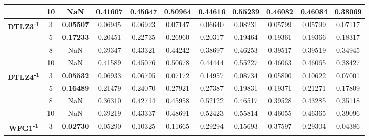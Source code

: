 \documentclass[conference]{IEEEtran}
\begin{document}
\begin{table*}[!htb]
\begin{tabular}{|c|c|c|c|c|c|c|c|c|c|c|}
		& 10         & NaN              & 0.41607           & 0.45647               & 0.50964          & 0.44616             & 0.55239             & 0.46082            & 0.46084              & 0.38069          \\ \hline
		\multirow{4}{*}{\textbf{DTLZ3\textsuperscript{-1}}} & 3          & \textbf{0.05507} & 0.06945           & 0.06923               & 0.07147          & 0.06640             & 0.08231             & 0.05799            & 0.05799              & 0.07117          \\ \cline{2-11} 
		& 5          & \textbf{0.17233} & 0.20451           & 0.22735               & 0.26960          & 0.20317             & 0.19464             & 0.19361            & 0.19366              & 0.18317          \\ \cline{2-11} 
		& 8          & NaN              & 0.39347           & 0.43321               & 0.44242          & 0.38697             & 0.46253             & 0.39517            & 0.39519              & 0.34945          \\ \cline{2-11} 
		& 10         & NaN              & 0.41589           & 0.45076               & 0.50678          & 0.44444             & 0.55227             & 0.46063            & 0.46065              & 0.38427          \\ \hline
		\multirow{4}{*}{\textbf{DTLZ4\textsuperscript{-1}}} & 3          & \textbf{0.05532} & 0.06933           & 0.06795               & 0.07172          & 0.14957             & 0.08734             & 0.05800            & 0.10622              & 0.07001          \\ \cline{2-11} 
		& 5          & \textbf{0.16489} & 0.21479           & 0.24070               & 0.27921          & 0.27387             & 0.19831             & 0.19371            & 0.21271              & 0.17809          \\ \cline{2-11} 
		& 8          & NaN              & 0.36310           & 0.42714               & 0.45958          & 0.52122             & 0.46517             & 0.39528            & 0.43285              & 0.35118          \\ \cline{2-11} 
		& 10         & NaN              & 0.39219           & 0.43337               & 0.48691          & 0.52423             & 0.55814             & 0.46055            & 0.46365              & 0.39096          \\ \hline
		\multirow{4}{*}{\textbf{WFG1\textsuperscript{-1}}}  & 3          & \textbf{0.02730} & 0.05290           & 0.10325               & 0.11665          & 0.29294             & 0.15693             & 0.37597            & 0.29304              & 0.04386          \\ \cline{2-11} 

\end{tabular}
\end{table*}
\end{document}

